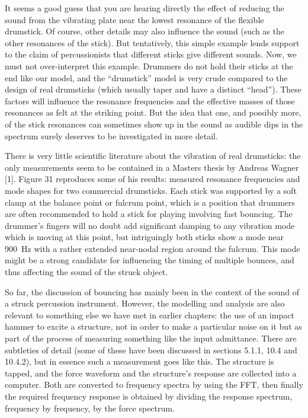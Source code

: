   It seems a good guess that you are hearing directly the effect of reducing 
  the sound from the vibrating plate near the lowest resonance of the flexible 
  drumstick. Of course, other details may also influence the sound (such as the 
  other resonances of the stick). But tentatively, this simple example lends 
  support to the claim of percussionists that different sticks give different 
  sounds. Now, we must not over-interpret this example. Drummers do not hold 
  their sticks at the end like our model, and the “drumstick” model is very 
  crude compared to the design of real drumsticks (which usually taper and have 
  a distinct “head”). These factors will influence the resonance frequencies 
  and the effective masses of those resonances as felt at the striking point. 
  But the idea that one, and possibly more, of the stick resonances can 
  sometimes show up in the sound as audible dips in the spectrum surely 
  deserves to be investigated in more detail. 

  There is very little scientific literature about the vibration of real 
  drumsticks: the only measurements seem to be contained in a Masters thesis by 
  Andreas Wagner [1]. Figure 31 reproduces some of his results: measured 
  resonance frequencies and mode shapes for two commercial drumsticks. Each 
  stick was supported by a soft clamp at the balance point or fulcrum point, 
  which is a position that drummers are often recommended to hold a stick for 
  playing involving fast bouncing. The drummer’s fingers will no doubt add 
  significant damping to any vibration mode which is moving at this point, but 
  intriguingly both sticks show a mode near 900~Hz with a rather extended 
  near-nodal region around the fulcrum. This mode might be a strong candidate 
  for influencing the timing of multiple bounces, and thus affecting the sound 
  of the struck object. 


  So far, the discussion of bouncing has mainly been in the context of the 
  sound of a struck percussion instrument. However, the modelling and analysis 
  are also relevant to something else we have met in earlier chapters: the use 
  of an impact hammer to excite a structure, not in order to make a particular 
  noise on it but as part of the process of measuring something like the input 
  admittance. There are subtleties of detail (some of these have been discussed 
  in sections 5.1.1, 10.4 and 10.4.2), but in essence such a measurement goes 
  like this. The structure is tapped, and the force waveform and the 
  structure’s response are collected into a computer. Both are converted to 
  frequency spectra by using the FFT, then finally the required frequency 
  response is obtained by dividing the response spectrum, frequency by 
  frequency, by the force spectrum. 


